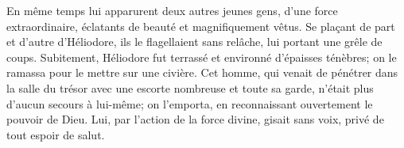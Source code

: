 En même temps lui apparurent deux autres jeunes gens,
	d’une force extraordinaire, éclatants de beauté et magnifiquement vêtus.
Se plaçant de part et d’autre d’Héliodore,
	ils le flagellaient sans relâche, lui portant une grêle de coups.
Subitement, Héliodore fut terrassé et environné d’épaisses ténèbres;
	on le ramassa pour le mettre sur une civière.
Cet homme, qui venait de pénétrer dans la salle du trésor
		avec une escorte nombreuse et toute sa garde,
	n’était plus d’aucun secours à lui-même;
	on l’emporta, en reconnaissant ouvertement le pouvoir de Dieu.
Lui, par l’action de la force divine, gisait sans voix, privé de tout espoir de salut.
